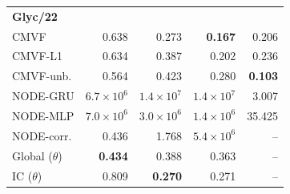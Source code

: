 \begin{tabular*}{\linewidth}{@{\extracolsep{\fill}}lrrrr}
\midrule
\multicolumn{5}{l}{\textbf{Glyc/22}} \\
CMVF & 0.638 & 0.273 & \textbf{0.167} & 0.206 \\
CMVF-L1 & 0.634 & 0.387 & 0.202 & 0.236 \\
CMVF-unb. & 0.564 & 0.423 & 0.280 & \textbf{0.103} \\
NODE-GRU & $6.7\!\times\!10^{6}$ & $1.4\!\times\!10^{7}$ & $1.4\!\times\!10^{7}$ & 3.007 \\
NODE-MLP & $7.0\!\times\!10^{6}$ & $3.0\!\times\!10^{6}$ & $1.4\!\times\!10^{6}$ & 35.425 \\
NODE-corr. & 0.436 & 1.768 & $5.4\!\times\!10^{6}$ & -- \\
Global ($\theta$) & \textbf{0.434} & 0.388 & 0.363 & -- \\
IC ($\theta$) & 0.809 & \textbf{0.270} & 0.271 & -- \\
\bottomrule
\end{tabular*}
